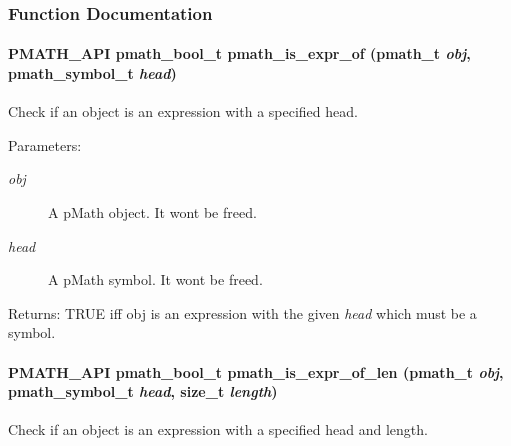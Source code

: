 \subsubsection{Function Documentation}
\hypertarget{group__helpers_g66eb580a000ee1d778b43dec124f170d}{
\paragraph[{pmath\_\-is\_\-expr\_\-of}]{\setlength{\rightskip}{0pt plus 5cm}PMATH\_\-API {\bf pmath\_\-bool\_\-t} pmath\_\-is\_\-expr\_\-of ({\bf pmath\_\-t} {\em obj}, \/  {\bf pmath\_\-symbol\_\-t} {\em head})}\hfill}
\label{group__helpers_g66eb580a000ee1d778b43dec124f170d}


Check if an object is an expression with a specified head. 

\begin{Desc}
\item[Parameters:]
\begin{description}
\item[{\em obj}]A pMath object. It wont be freed. \item[{\em head}]A pMath symbol. It wont be freed. \end{description}
\end{Desc}
\begin{Desc}
\item[Returns:]TRUE iff obj is an expression with the given {\em head\/} which must be a symbol. \end{Desc}
\hypertarget{group__helpers_g68d264fe6b3db0931b4d0a8d5c7427f5}{
\paragraph[{pmath\_\-is\_\-expr\_\-of\_\-len}]{\setlength{\rightskip}{0pt plus 5cm}PMATH\_\-API {\bf pmath\_\-bool\_\-t} pmath\_\-is\_\-expr\_\-of\_\-len ({\bf pmath\_\-t} {\em obj}, \/  {\bf pmath\_\-symbol\_\-t} {\em head}, \/  size\_\-t {\em length})}\hfill}
\label{group__helpers_g68d264fe6b3db0931b4d0a8d5c7427f5}


Check if an object is an expression with a specified head and length. 

